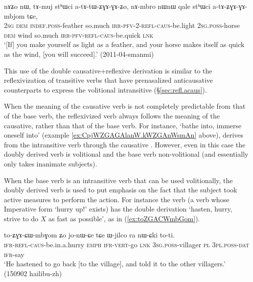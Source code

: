 \begin{exe}
\ex \label{ex:atAtWGAZo.AtAZGAGAmbjom}
\gll nɤʑo nɯ, tɤ-muj stʰɯci a-tɤ-tɯ-ʑɣɤ-ɣɤ-ʑo,  nɤ-mbro nɯnɯ qale stʰɯci a-tɤ-ʑɣɤ-ɣɤ-mbjom tɕe, \\
\textsc{2sg} \textsc{dem} \textsc{indef}.\textsc{poss}-feather so.much \textsc{irr}-\textsc{pfv}-2-\textsc{refl}-\textsc{caus}-be.light \textsc{2sg}.\textsc{poss}-horse \textsc{dem} wind so.much \textsc{irr}-\textsc{pfv}-\textsc{refl}-\textsc{caus}-be.quick \textsc{lnk} \\
\glt  `[If] you make yourself as light as a feather, and your horse makes itself as quick as the wind, [you will succeed].'  (2011-04-smanmi)
 \end{exe}

This use of the double causative+reflexive derivation is similar to the reflexivization of transitive verbs that have prenasalized anticausative counterparts to express the volitional intransitive (§\ref {sec:refl.acaus}).

When the meaning of the causative verb is not completely predictable from that of the base verb, the reflexivized verb always follows the meaning of the causative, rather than that of the base verb. For instance,  `bathe into, immerse oneself into' (example \ref{ex:CpjWZGAGAlanW.kWZGAnWsmAn} above), derives from the intransitive verb  through the causative . However, even in this case the doubly derived verb  is volitional and the base verb   non-volitional (and essentially only takes inanimate subjects).

When the base verb is an intransitive verb that can be used volitionally, the doubly derived verb is used to put emphasis on the fact that the subject took active measures to perform the action. For instance  the verb  (a verb whose Imperative form  `hurry up!' exists) has the double derivation  `hasten, hurry, strive to do $X$ as fast as possible', as in (\ref{ex:toZGACWmbGom}).

\begin{exe}
\ex \label{ex:toZGACWmbGom}
\gll to-ʑɣɤ-ɕɯ-mbɣom ʑo jo-nɯ-ɕe tɕe ɯ-jilco ra nɯ-ɕki to-ti. \\
\textsc{ifr}-\textsc{refl}-\textsc{caus}-be.in.a.hurry \textsc{emph} \textsc{ifr}-\textsc{vert}-go \textsc{lnk} \textsc{3sg}.\textsc{poss}-villager \textsc{pl} \textsc{3pl}.\textsc{poss}-\textsc{dat} \textsc{ifr}-say \\
\glt `He hastened to go back [to the village], and told it to the other villagers.' (150902 hailibu-zh) 
\end{exe}

